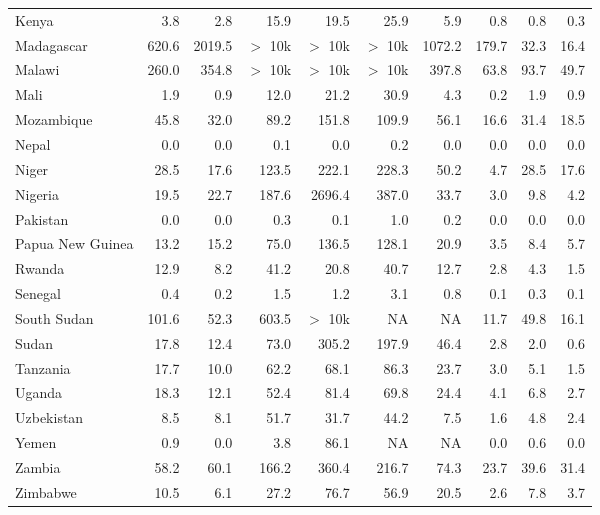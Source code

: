 \begin{table}[b]
{\begin{tabular}[t]{lrrrrrrrrr}
Kenya & 3.8 & 2.8 & 15.9 & 19.5 & 25.9 & 5.9 & 0.8 & 0.8 & 0.3\\
Madagascar & 620.6 & 2019.5 & $>$ 10k & $>$ 10k & $>$ 10k & 1072.2 & 179.7 & 32.3 & 16.4\\
Malawi & 260.0 & 354.8 & $>$ 10k & $>$ 10k & $>$ 10k & 397.8 & 63.8 & 93.7 & 49.7\\
Mali & 1.9 & 0.9 & 12.0 & 21.2 & 30.9 & 4.3 & 0.2 & 1.9 & 0.9\\
Mozambique & 45.8 & 32.0 & 89.2 & 151.8 & 109.9 & 56.1 & 16.6 & 31.4 & 18.5\\
Nepal & 0.0 & 0.0 & 0.1 & 0.0 & 0.2 & 0.0 & 0.0 & 0.0 & 0.0\\
Niger & 28.5 & 17.6 & 123.5 & 222.1 & 228.3 & 50.2 & 4.7 & 28.5 & 17.6\\
Nigeria & 19.5 & 22.7 & 187.6 & 2696.4 & 387.0 & 33.7 & 3.0 & 9.8 & 4.2\\
Pakistan & 0.0 & 0.0 & 0.3 & 0.1 & 1.0 & 0.2 & 0.0 & 0.0 & 0.0\\
Papua New Guinea & 13.2 & 15.2 & 75.0 & 136.5 & 128.1 & 20.9 & 3.5 & 8.4 & 5.7\\
Rwanda & 12.9 & 8.2 & 41.2 & 20.8 & 40.7 & 12.7 & 2.8 & 4.3 & 1.5\\
Senegal & 0.4 & 0.2 & 1.5 & 1.2 & 3.1 & 0.8 & 0.1 & 0.3 & 0.1\\
South Sudan & 101.6 & 52.3 & 603.5 & $>$ 10k & NA & NA & 11.7 & 49.8 & 16.1\\
Sudan & 17.8 & 12.4 & 73.0 & 305.2 & 197.9 & 46.4 & 2.8 & 2.0 & 0.6\\
Tanzania & 17.7 & 10.0 & 62.2 & 68.1 & 86.3 & 23.7 & 3.0 & 5.1 & 1.5\\
Uganda & 18.3 & 12.1 & 52.4 & 81.4 & 69.8 & 24.4 & 4.1 & 6.8 & 2.7\\
Uzbekistan & 8.5 & 8.1 & 51.7 & 31.7 & 44.2 & 7.5 & 1.6 & 4.8 & 2.4\\
Yemen & 0.9 & 0.0 & 3.8 & 86.1 & NA & NA & 0.0 & 0.6 & 0.0\\
Zambia & 58.2 & 60.1 & 166.2 & 360.4 & 216.7 & 74.3 & 23.7 & 39.6 & 31.4\\
Zimbabwe & 10.5 & 6.1 & 27.2 & 76.7 & 56.9 & 20.5 & 2.6 & 7.8 & 3.7\\
\bottomrule
\end{tabular}}
\end{table}